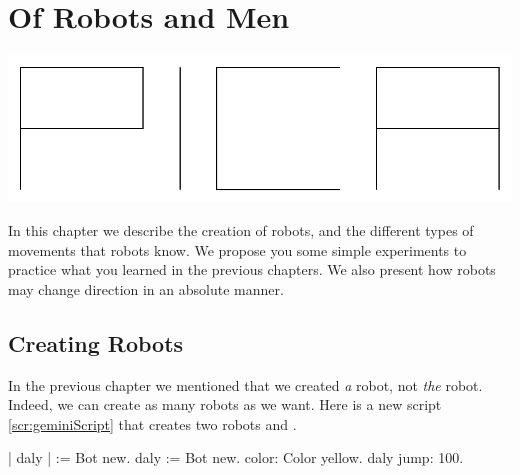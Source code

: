
\ifx\wholebook\relax\else



\fi

\chapter{Of Robots and Men}\label{ch:TurtleMen}\label{ch:robotMen}

\begin{chapterfigure}
\includegraphics[width=0.9\linewidth]{turtleMPica}
\end{chapterfigure}


In this chapter we describe the creation of robots, and the different types of movements that robots know. We propose you some simple experiments to practice what you learned in the previous chapters. We also present how robots may change direction in an absolute manner.  


\section{Creating Robots}
In the previous chapter we mentioned that we created \emph{a} robot, not \emph{the} robot. Indeed, we can create as many robots as we want. Here is a new script \ref{scr:geminiScript} that creates two robots \ct{\caro} and .

\begin{scriptwithouttitle} \label{scr:geminiScript}
| \caro daly |
\caro := Bot new.
daly := Bot new.
\caro color: Color yellow.
daly jump: 100.
\end{scriptwithouttitle}

